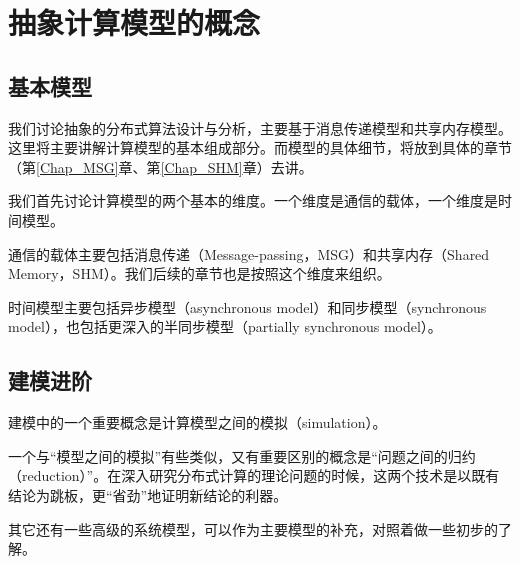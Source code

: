 \chapter{抽象计算模型的概念}

\section{基本模型}

我们讨论抽象的分布式算法设计与分析，主要基于消息传递模型和共享内存模型。
这里将主要讲解计算模型的基本组成部分。而模型的具体细节，将放到具体的章节（第\ref{Chap_MSG}章、第\ref{Chap_SHM}章）去讲。

我们首先讨论计算模型的两个基本的维度。一个维度是通信的载体，一个维度是时间模型。

通信的载体主要包括消息传递（Message-passing，MSG）和共享内存（Shared Memory，SHM）。我们后续的章节也是按照这个维度来组织。

时间模型主要包括异步模型（asynchronous model）和同步模型（synchronous model），也包括更深入的半同步模型（partially synchronous model）。



\section{建模进阶}

建模中的一个重要概念是计算模型之间的模拟（simulation）。


一个与“模型之间的模拟”有些类似，又有重要区别的概念是“问题之间的归约（reduction）”。在深入研究分布式计算的理论问题的时候，这两个技术是以既有结论为跳板，更“省劲”地证明新结论的利器。

其它还有一些高级的系统模型，可以作为主要模型的补充，对照着做一些初步的了解。

